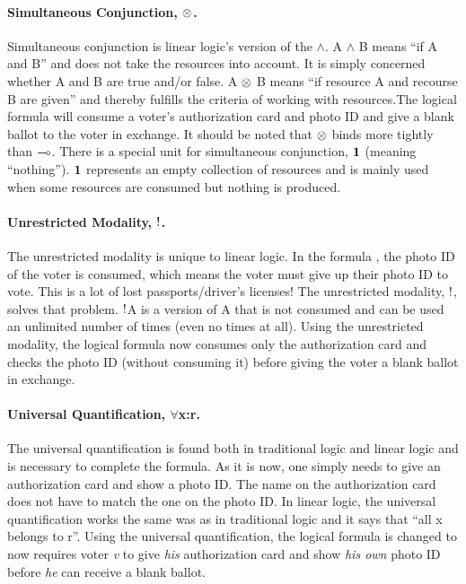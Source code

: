 \paragraph{Simultaneous Conjunction, $\otimes$.} Simultaneous conjunction is linear logic’s version of the $\wedge$. A $\wedge$ B means “if A and B” and does not take the resources into account. It is simply concerned whether A and B are true and/or false. A $\otimes$ B means “if resource A and recourse B are given” and thereby fulfills the criteria of working with resources.The logical formula
will consume a voter’s authorization card and photo ID and give a blank ballot to the voter in exchange. It should be noted that $\otimes$ binds more tightly than $\multimap$.
There is a special unit for simultaneous conjunction, $\mathord{\text{\rm\bf 1}}$ (meaning “nothing”). $\mathord{\text{\rm\bf 1}}$ represents an empty collection of resources and is mainly used when some resources are consumed but nothing is produced.

\paragraph{Unrestricted Modality, $\mathord{\text{\rm !}}$.} The unrestricted modality is unique to linear logic. In the formula , the photo ID of the voter is consumed, which means the voter must give up their photo ID to vote. This is a lot of lost passports/driver’s licenses!
The unrestricted modality, $\mathord{\text{\rm !}}$, solves that problem. $\mathord{\text{\rm !}}$A is a version of A that is not consumed and can be used an unlimited number of times (even no times at all). Using the unrestricted modality, the logical formula
now consumes only the authorization card and checks the photo ID (without consuming it) before giving the voter a blank ballot in exchange. 

\paragraph{Universal Quantification, $\forall$x:r.} The universal quantification is found both in traditional logic and linear logic and is necessary to complete the formula. As it is now, one simply needs to give an authorization card and show a photo ID. The name on the authorization card does not have to match the one on the photo ID.
In linear logic, the universal quantification works the same was as in traditional logic and it says that “all x belongs to r”. Using the universal quantification, the logical formula is changed to
now requires voter \textit{v} to give \textit{his} authorization card and show \textit{his own} photo ID before \textit{he} can receive a blank ballot.


